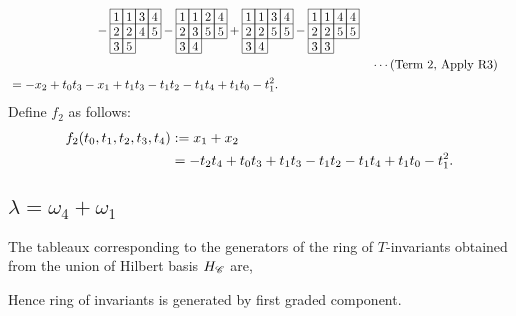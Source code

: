 \begin{align*}
\begin{array}[c]{*{4}c}
\end{array}
\\
&\hspace{70pt}
-\begin{array}[c]{*{4}c}\cline{1-4}
\lr{1}&\lr{1}&\lr{3}&\lr{4}\\\cline{1-4}
\lr{2}&\lr{2}&\lr{4}&\lr{5}\\\cline{1-4}
\lr{3}&\lr{5}\\\cline{1-2}
\end{array}
-\begin{array}[c]{*{4}c}\cline{1-4}
\lr{1}&\lr{1}&\lr{2}&\lr{4}\\\cline{1-4}
\lr{2}&\lr{3}&\lr{5}&\lr{5}\\\cline{1-4}
\lr{3}&\lr{4}\\\cline{1-2}
\end{array}
+\begin{array}[c]{*{4}c}\cline{1-4}
\lr{1}&\lr{1}&\lr{3}&\lr{4}\\\cline{1-4}
\lr{2}&\lr{2}&\lr{5}&\lr{5}\\\cline{1-4}
\lr{3}&\lr{4}\\\cline{1-2}
\end{array}
-\begin{array}[c]{*{4}c}\cline{1-4}
\lr{1}&\lr{1}&\lr{4}&\lr{4}\\\cline{1-4}
\lr{2}&\lr{2}&\lr{5}&\lr{5}\\\cline{1-4}
\lr{3}&\lr{3}\\\cline{1-2}
\end{array}
\\
& &&\cdots (\text{Term 2, Apply R3})\\
&=
-x_2 + t_0t_3 - x_1 + t_1t_3 - t_1t_2 - t_1t_4 + t_1t_0 - t_1^2.
\end{align*}
Define \(f_2\) as follows:
\begin{align*}
    f_2(t_0,t_1,t_2,t_3,t_4) &:= x_1 + x_2\\ 
    & = - t_2t_4 + t_0t_3 + t_1t_3 - t_1t_2 - t_1t_4 + t_1t_0 - t_1^2.
\end{align*}


\subsection{\(\lambda=\omega_4+\omega_1\)}
\label{sec:fv_hb41}
The tableaux corresponding to the generators of the ring of $T$-invariants obtained from the union of Hilbert basis $H_{\mathscr{C}}$ are,


\noindent Hence ring of invariants is generated by first graded component.

